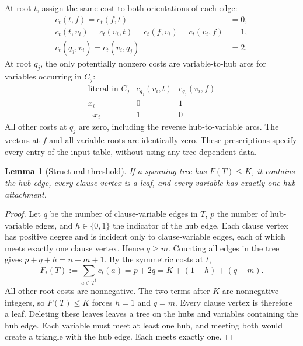 \documentclass[11pt]{article}
\newtheorem{lemma}{Lemma}
\begin{document}
At root $t$, assign the same cost to both orientations of each edge:
\begin{equation}\label{eq:basecost}
 \begin{aligned}
 c_t(t,f)=c_t(f,t)&=0,\\
 c_t(t,v_i)=c_t(v_i,t)=c_t(f,v_i)=c_t(v_i,f)&=1,\\
 c_t(q_j,v_i)=c_t(v_i,q_j)&=2.
 \end{aligned}
\end{equation}
At root $q_j$, the only potentially nonzero costs are variable-to-hub
arcs for variables occurring in $C_j$:
\begin{equation}\label{eq:literalcost}
 \begin{array}{c|cc}
 \text{literal in }C_j & c_{q_j}(v_i,t)&c_{q_j}(v_i,f)\\\hline
 x_i&0&1\\
 \neg x_i&1&0
 \end{array}
\end{equation}
All other costs at $q_j$ are zero, including the reverse hub-to-variable
arcs. The vectors at $f$ and all variable roots are identically zero.
These prescriptions specify every entry of the input table, without
using any tree-dependent data.

\begin{lemma}[Structural threshold]\label{lem:structure}
If a spanning tree has $F(T)\leq K$, it contains the hub edge, every clause
vertex is a leaf, and every variable has exactly one hub attachment.
\end{lemma}
\begin{proof}
Let $q$ be the number of clause-variable edges in $T$, $p$ the number
of hub-variable edges, and $h\in\{0,1\}$ the indicator of the hub edge.
Each clause vertex has positive degree and is incident only to
clause-variable edges, each of which meets exactly one clause vertex.
Hence $q\geq m$. Counting all edges in the tree gives
$p+q+h=n+m+1$. By the symmetric costs at $t$,
\begin{equation}\label{eq:structural}
 F_t(T):=\sum_{a\in T^t}c_t(a)=p+2q
       =K+(1-h)+(q-m).
\end{equation}
All other root costs are nonnegative. The two terms after $K$ are
nonnegative integers, so $F(T)\leq K$ forces $h=1$ and $q=m$.
Every clause vertex is therefore a leaf. Deleting these leaves leaves a
tree on the hubs and variables containing the hub edge. Each variable
must meet at least one hub, and meeting both would create a triangle
with the hub edge. Each meets exactly one.
\end{proof}
\end{document}
